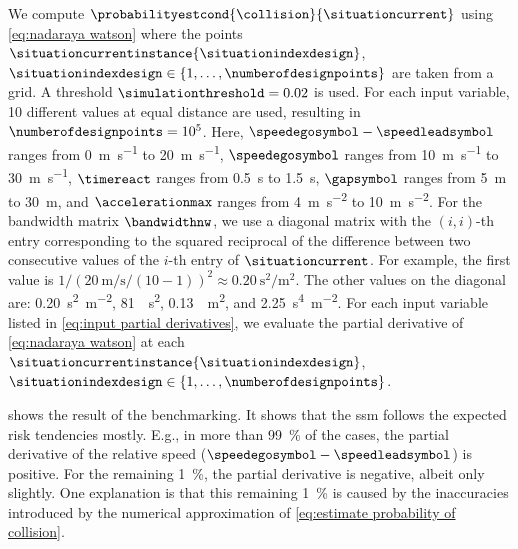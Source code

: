 We compute $\probabilityestcond{\collision}{\situationcurrent}$ using \cref{eq:nadaraya watson} where the points $\situationcurrentinstance{\situationindexdesign}$, $\situationindexdesign\in\{1,\ldots,\numberofdesignpoints\}$ are taken from a grid.
A threshold $\simulationthreshold=0.02$ is used.
For each input variable, 10 different values at equal distance are used, resulting in $\numberofdesignpoints=10^5$.
Here, $\speedegosymbol-\speedleadsymbol$ ranges from \SI{0}{\meter\per\second} to \SI{20}{\meter\per\second}, $\speedegosymbol$ ranges from \SI{10}{\meter\per\second} to \SI{30}{\meter\per\second}, $\timereact$ ranges from \SI{0.5}{\second} to \SI{1.5}{\second}, $\gapsymbol$ ranges from \SI{5}{\meter} to \SI{30}{\meter}, and $\accelerationmax$ ranges from \SI{4}{\meter\per\second\squared} to \SI{10}{\meter\per\second\squared}.
For the bandwidth matrix $\bandwidthnw$, we use a diagonal matrix with the $(i,i)$-th entry corresponding to the squared reciprocal of the difference between two consecutive values of the $i$-th entry of $\situationcurrent$.
For example, the first value is $1/(\SI{20}{\meter\per\second}/(10-1))^2 \approx \SI{0.20}{\second\squared\per\meter\squared}$. 
The other values on the diagonal are: \SI{0.20}{\second\squared\per\meter\squared}, \SI{81}{\per\second\squared}, \SI{0.13}{\per\meter\squared}, and \SI{2.25}{\second\tothe{4}\per\meter\squared}.
For each input variable listed in \cref{eq:input partial derivatives}, we evaluate the partial derivative of \cref{eq:nadaraya watson} at each $\situationcurrentinstance{\situationindexdesign}$, $\situationindexdesign\in\{1,\ldots,\numberofdesignpoints\}$.

 shows the result of the benchmarking. 
It shows that the \ac{ssm} follows the expected risk tendencies mostly. 
E.g., in more than \SI{99}{\%} of the cases, the partial derivative of the relative speed ($\speedegosymbol-\speedleadsymbol$) is positive.
For the remaining \SI{1}{\%}, the partial derivative is negative, albeit only slightly. 
One explanation is that this remaining \SI{1}{\percent} is caused by the inaccuracies introduced by the numerical approximation of \cref{eq:estimate probability of collision}.

